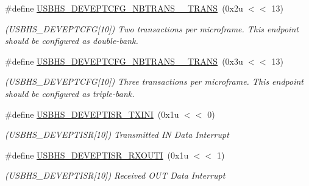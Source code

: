 \begin{DoxyCompactItemize}
\mbox{\label{group__SAMS70__USBHS_ga344108e9f3093a59992c4b40dcf55d85}} 
\#define \mbox{\hyperlink{group__SAMS70__USBHS_ga344108e9f3093a59992c4b40dcf55d85}{U\+S\+B\+H\+S\+\_\+\+D\+E\+V\+E\+P\+T\+C\+F\+G\+\_\+\+N\+B\+T\+R\+A\+N\+S\+\_\+\_\+\+T\+R\+A\+NS}}~(0x2u $<$$<$ 13)
\begin{DoxyCompactList}\small\item\em (U\+S\+B\+H\+S\+\_\+\+D\+E\+V\+E\+P\+T\+C\+FG\mbox{[}10\mbox{]}) Two transactions per microframe. This endpoint should be configured as double-\/bank. \end{DoxyCompactList}\item 
\mbox{\label{group__SAMS70__USBHS_ga668cdeba374eaa8796bc36556b33d305}} 
\#define \mbox{\hyperlink{group__SAMS70__USBHS_ga668cdeba374eaa8796bc36556b33d305}{U\+S\+B\+H\+S\+\_\+\+D\+E\+V\+E\+P\+T\+C\+F\+G\+\_\+\+N\+B\+T\+R\+A\+N\+S\+\_\+\_\+\+T\+R\+A\+NS}}~(0x3u $<$$<$ 13)
\begin{DoxyCompactList}\small\item\em (U\+S\+B\+H\+S\+\_\+\+D\+E\+V\+E\+P\+T\+C\+FG\mbox{[}10\mbox{]}) Three transactions per microframe. This endpoint should be configured as triple-\/bank. \end{DoxyCompactList}\item 
\mbox{\label{group__SAMS70__USBHS_ga90f3eb46b67012a13277f7fa34a433d9}} 
\#define \mbox{\hyperlink{group__SAMS70__USBHS_ga90f3eb46b67012a13277f7fa34a433d9}{U\+S\+B\+H\+S\+\_\+\+D\+E\+V\+E\+P\+T\+I\+S\+R\+\_\+\+T\+X\+I\+NI}}~(0x1u $<$$<$ 0)
\begin{DoxyCompactList}\small\item\em (U\+S\+B\+H\+S\+\_\+\+D\+E\+V\+E\+P\+T\+I\+SR\mbox{[}10\mbox{]}) Transmitted IN Data Interrupt \end{DoxyCompactList}\item 
\mbox{\label{group__SAMS70__USBHS_ga0cb192d6efb653c28e962175c389896a}} 
\#define \mbox{\hyperlink{group__SAMS70__USBHS_ga0cb192d6efb653c28e962175c389896a}{U\+S\+B\+H\+S\+\_\+\+D\+E\+V\+E\+P\+T\+I\+S\+R\+\_\+\+R\+X\+O\+U\+TI}}~(0x1u $<$$<$ 1)
\begin{DoxyCompactList}\small\item\em (U\+S\+B\+H\+S\+\_\+\+D\+E\+V\+E\+P\+T\+I\+SR\mbox{[}10\mbox{]}) Received O\+UT Data Interrupt \end{DoxyCompactList}\item 

\end{DoxyCompactItemize}
